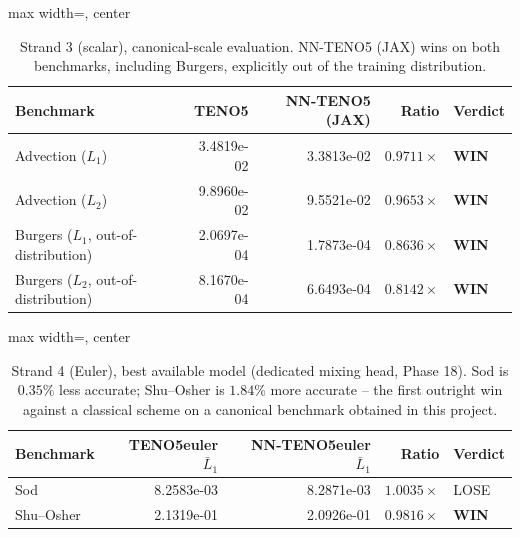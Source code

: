 \documentclass[11pt]{article}
\begin{document}
\begin{table}[htbp]
\begin{adjustbox}{max width=\textwidth, center}
\begin{tabular}{lrrrl}
\toprule
\textbf{Benchmark} & \textbf{TENO5} & \textbf{NN-TENO5 (JAX)} & \textbf{Ratio} & \textbf{Verdict} \\
\midrule
Advection ($L_1$) & 3.4819e-02 & 3.3813e-02 & $0.9711\times$ & \textbf{WIN} \\
\rowrule
Advection ($L_2$) & 9.8960e-02 & 9.5521e-02 & $0.9653\times$ & \textbf{WIN} \\
\rowrule
Burgers ($L_1$, out-of-distribution) & 2.0697e-04 & 1.7873e-04 & $0.8636\times$ & \textbf{WIN} \\
\rowrule
Burgers ($L_2$, out-of-distribution) & 8.1670e-04 & 6.6493e-04 & $0.8142\times$ & \textbf{WIN} \\
\bottomrule
\end{tabular}
\end{adjustbox}
\caption{Strand 3 (scalar), canonical-scale evaluation. NN-TENO5 (JAX)
wins on both benchmarks, including Burgers, explicitly out of the training
distribution.\label{tab:strand3}}
\end{table}

\begin{table}[htbp]
\begin{adjustbox}{max width=\textwidth, center}
\begin{tabular}{lrrrl}
\toprule
\textbf{Benchmark} & \textbf{TENO5euler $\bar L_1$} & \textbf{NN-TENO5euler $\bar L_1$} & \textbf{Ratio} & \textbf{Verdict} \\
\midrule
Sod & 8.2583e-03 & 8.2871e-03 & $1.0035\times$ & LOSE \\
\rowrule
Shu--Osher & 2.1319e-01 & 2.0926e-01 & $0.9816\times$ & \textbf{WIN} \\
\bottomrule
\end{tabular}
\end{adjustbox}
\caption{Strand 4 (Euler), best available model (dedicated mixing head,
Phase 18). Sod is $0.35\%$ less accurate; Shu--Osher is $1.84\%$ more
accurate -- the first outright win against a classical scheme on a
canonical benchmark obtained in this project.}
\end{table}
\end{document}
